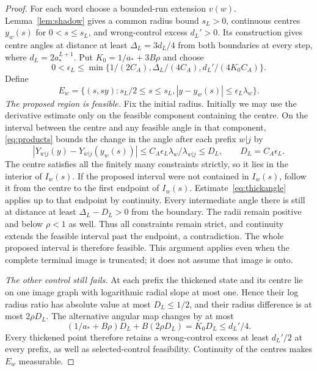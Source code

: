 \documentclass[11pt]{amsart}
\theoremstyle{definition}
\theoremstyle{remark}
\numberwithin{equation}{section}
\begin{document}
\begin{proof}
For each word choose a bounded-run extension $v(w)$.
Lemma~\ref{lem:shadow} gives a common radius bound $s_L>0$,
continuous centres $y_w(s)$ for $0<s\le s_L$, and wrong-control
excess $d_L'>0$. Its construction gives centre angles at distance
at least $\Delta_L=3d_L/4$ from both boundaries at every step,
where $d_L=2a_*^{L+1}$.
Put $K_0=1/a_*+3B\rho$ and choose
\[
0<\epsilon_L\le\min\{1/(2C_A),\Delta_L/(4C_A),
                                      d_L'/(4K_0C_A)\}.
\]
Define
\begin{equation}\label{eq:forcedregion}
E_w=\{(s,sy):s_L/2\le s\le s_L,
                         |y-y_w(s)|\le\epsilon_L\lambda_w\}.
\end{equation}
\smallskip
\emph{The proposed region is feasible.}
Fix the initial radius. Initially we may use the derivative estimate
only on the feasible component containing the centre. On the
interval between the
centre and any feasible angle in that component, \eqref{eq:products} bounds the
change in the angle after each prefix $w|j$ by
\begin{equation}\label{eq:thickangle}
|Y_{w|j}(y)-Y_{w|j}(y_w(s))|
 \le C_A\epsilon_L\lambda_w/\lambda_{w|j}
 \le D_L,\qquad D_L=C_A\epsilon_L.
\end{equation}
The centre satisfies all the finitely many constraints strictly,
so it lies in the interior of $I_w(s)$. If the proposed interval
were not contained in $I_w(s)$, follow it from the centre to the
first endpoint of $I_w(s)$. Estimate~\eqref{eq:thickangle} applies
up to that endpoint by continuity. Every intermediate angle
there is still at distance at least $\Delta_L-D_L>0$ from the
boundary. The radii remain positive and below $\rho<1$ as well.
Thus all constraints remain strict, and continuity extends the
feasible interval past the endpoint, a contradiction. The whole
proposed interval is therefore feasible.
This argument applies even when the complete terminal image is
truncated; it does not assume that image is onto.

\smallskip
\emph{The other control still fails.}
At each prefix the thickened state and its centre lie on one image
graph with logarithmic radial slope at most one. Hence their log
radius ratio has absolute value at most $D_L\le1/2$, and their
radius difference is at most $2\rho D_L$.
The alternative angular map changes by at most
\[
(1/a_*+B\rho)D_L+B(2\rho D_L)=K_0D_L\le d_L'/4.
\]
Every thickened point therefore retains a wrong-control excess
at least $d_L'/2$ at every prefix, as well as selected-control
feasibility. Continuity of the centres makes $E_w$ measurable.


\end{proof}
\end{document}
